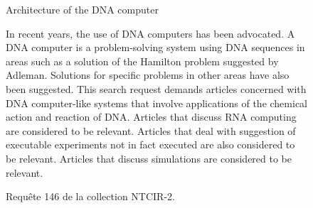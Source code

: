 \begin{figure}
    \centering

\begin{mdframed}[backgroundcolor=blue!2, font=\small]
    
    Architecture of the DNA computer

    \vspace{0.3em}

    \quad In recent years, the use of DNA computers has been advocated. A DNA computer is a problem-solving system using DNA sequences in areas such as a solution of the Hamilton problem suggested by Adleman. Solutions for specific problems in other areas have also been suggested. This search request demands articles concerned with DNA computer-like systems that involve applications of the chemical action and reaction of DNA. Articles that discuss RNA computing are considered to be relevant. Articles that deal with suggestion of executable experiments not in fact executed are also considered to be relevant. Articles that discuss simulations are considered to be relevant.
    
    
\end{mdframed}

    \caption{Requête 146 de la collection NTCIR-2.}
    \label{fig:topic_topic_drift}
\end{figure}

